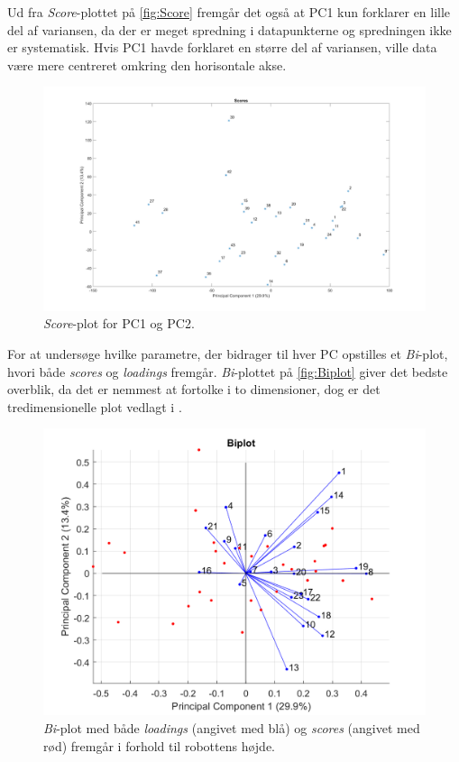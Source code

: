 %
Ud fra \textit{Score}-plottet på \autoref{fig:Score} fremgår det også at PC1 kun forklarer en lille del af variansen, da der er meget spredning i datapunkterne og spredningen ikke er systematisk. Hvis PC1 havde forklaret en større del af variansen, ville data være mere centreret omkring den horisontale akse.
%
\begin{figure}[H]
\centering
\includegraphics[width=\textwidth]{Figure/DatabehandlingSkalaer/PCAfigures/Scores}
\caption{\textit{Score}-plot for PC1 og PC2.}
\label{fig:Score}
\end{figure}
\noindent
%
For at undersøge hvilke parametre, der bidrager til hver PC opstilles et \textit{Bi}-plot, hvori både \textit{scores} og \textit{loadings} fremgår. \textit{Bi}-plottet på \autoref{fig:Biplot} giver det bedste overblik, da det er nemmest at fortolke i to dimensioner, dog er det tredimensionelle plot vedlagt i . 
%
\begin{figure}[H]
\centering
\includegraphics[width=\textwidth]{Figure/DatabehandlingSkalaer/PCAfigures/Biplot}
\caption{\textit{Bi}-plot med både \textit{loadings} (angivet med blå) og \textit{scores} (angivet med rød) fremgår i forhold til robottens højde.}
\label{fig:Biplot}
\end{figure}
